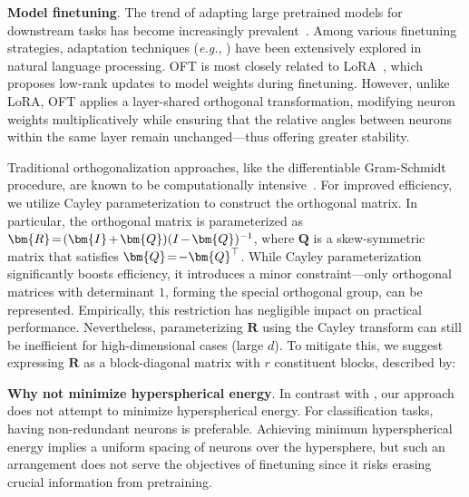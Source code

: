 \begin{itemize}[leftmargin=*,nosep]
\textbf{Model finetuning}. The trend of adapting large pretrained models for downstream tasks has become increasingly prevalent~\cite{devlin2018bert,brown2020language,he2022masked}. Among various finetuning strategies, adaptation techniques (\emph{e.g.}, \cite{hulora2022,houlsby2019parameter,pfeiffer2020adapterfusion}) have been extensively explored in natural language processing. OFT is most closely related to LoRA~\cite{hulora2022}, which proposes low-rank updates to model weights during finetuning. However, unlike LoRA, OFT applies a layer-shared orthogonal transformation, modifying neuron weights multiplicatively while ensuring that the relative angles between neurons within the same layer remain unchanged—thus offering greater stability.

\begin{itemize}[leftmargin=*,nosep]

Traditional orthogonalization approaches, like the differentiable Gram-Schmidt procedure, are known to be computationally intensive~\cite{liu2021orthogonal}. For improved efficiency, we utilize Cayley parameterization to construct the orthogonal matrix. In particular, the orthogonal matrix is parameterized as $\thickmuskip=2mu \medmuskip=2mu \bm{R}=(\bm{I}+\bm{Q})(I-\bm{Q})^{-1}$, where $\bm{Q}$ is a skew-symmetric matrix that satisfies $\thickmuskip=2mu \medmuskip=2mu \bm{Q}=-\bm{Q}^\top$. While Cayley parameterization significantly boosts efficiency, it introduces a minor constraint—only orthogonal matrices with determinant $1$, forming the special orthogonal group, can be represented. Empirically, this restriction has negligible impact on practical performance. Nevertheless, parameterizing $\bm{R}$ using the Cayley transform can still be inefficient for high-dimensional cases (large $d$). To mitigate this, we suggest expressing $\bm{R}$ as a block-diagonal matrix with $r$ constituent blocks, described by:

\textbf{Why not minimize hyperspherical energy}. In contrast with \cite{liu2021orthogonal}, our approach does not attempt to minimize hyperspherical energy. For classification tasks, having non-redundant neurons is preferable. Achieving minimum hyperspherical energy implies a uniform spacing of neurons over the hypersphere, but such an arrangement does not serve the objectives of finetuning since it risks erasing crucial information from pretraining.


\end{itemize}
\end{itemize}
